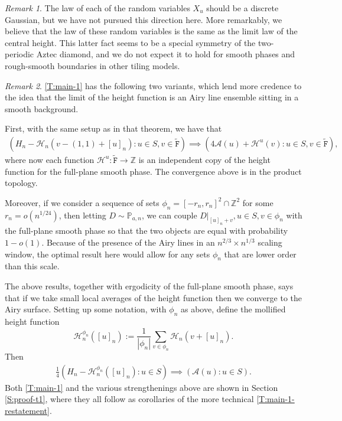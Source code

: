 \documentclass[11pt,twoside]{amsart}
\theoremstyle{plain}
\numberwithin{quest}{section}
\theoremstyle{remark}
\newtheorem{rem}{Remark}
\numberwithin{rem}{section}
\theoremstyle{definition}
\newcommand{\Z}{\mathbb{Z}}
\renewcommand{\P}{\mathbb{P}}
\newcommand{\cA}{\mathcal{A}}
\newcommand{\cH}{\mathcal{H}}
\renewcommand{\tt}[1]{{\mathtt{#1}}}
\begin{document}
	\begin{rem}
		The law of each of the random variables $X_u$ should be a discrete Gaussian, but we have not pursued this direction here. More remarkably, we believe that the law of these random variables is the same as the limit law of the central height. This latter fact seems to be a special symmetry of the two-periodic Aztec diamond, and we do not expect it to hold for smooth phases and rough-smooth boundaries in other tiling models.
	\end{rem}
	
	
	\begin{rem}
		\label{R:main-thm-variants}
		\cref{T:main-1} has the following two variants, which lend more credence to the idea that the limit of the height function is an Airy line ensemble sitting in a smooth background.
		
		First, with the same setup as in that theorem, we have that
		\begin{equation*}
			\begin{split}
				(H_n - \cH_n(v - (1, 1) + [u]_n) : u \in S, v \in \tt{\tilde F})
				\implies (4\cA(u) + \cH^u(v) : u \in S, v \in \tt{\tilde F}),
			\end{split}
		\end{equation*}
		where now each function $\cH^u:\tt{\tilde F} \to \Z$ is an independent copy of the height function for the full-plane smooth phase. The convergence above is in the product topology.
		
		Moreover, if we consider a sequence of sets $\phi_n = [-r_n, r_n]^2 \cap \Z^2$ for some $r_n = o(n^{1/24})$, then letting $D \sim \P_{a, n}$, we can couple $D|_{[u]_n + v}, u \in S, v \in \phi_n$ with the full-plane smooth phase so that the two objects are equal with probability $1 - o(1)$. Because of the presence of the Airy lines in an $n^{2/3} \times n^{1/3}$ scaling window, the optimal result here would allow for any sets $\phi_n$ that are lower order than this scale. 
		
		The above results, together with ergodicity of the full-plane smooth phase, says that if we take small local averages of the height function then we converge to the Airy surface. Setting up some notation, with $\phi_n$ as above, define the mollified height function
		$$
		\cH_n^{\phi_n}([u]_n) := \frac{1}{|\phi_n|} \sum_{v \in \phi_n} \cH_n(v + [u]_n).
		$$
		Then
		\begin{equation*}
			\begin{split}
				\tfrac{1}{4} (H_n - \cH_n^{\phi_n}([u]_n) : u \in S)
				\implies (\cA(u) : u \in S).
			\end{split}
		\end{equation*}
		Both \cref{T:main-1} and the various strengthenings above are shown in Section \ref{S:proof-t1}, where they all follow as corollaries of the more technical \cref{T:main-1-restatement}.
	\end{rem}
\end{document}
